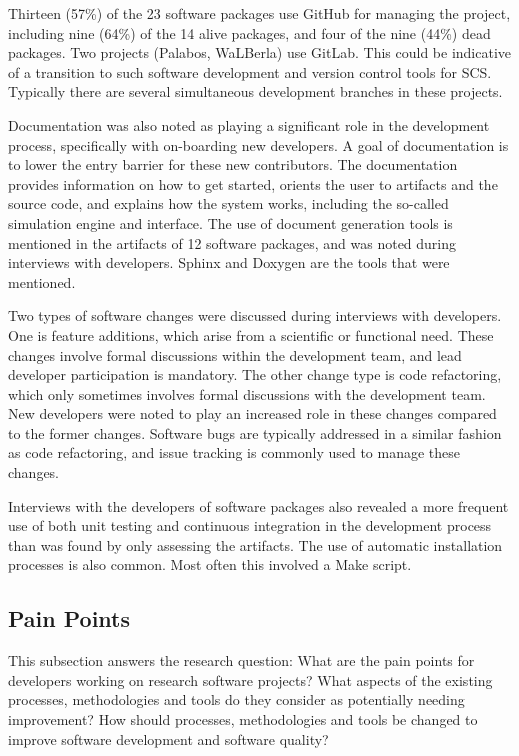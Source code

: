 \documentclass[final, 3p, times, authoryear]{elsarticle}
\begin{document}
Thirteen (57\%) of the 23 software packages use GitHub for managing the project,
including nine (64\%) of the 14 alive packages, and four of the nine (44\%) dead
packages. Two projects (Palabos, WaLBerla) use GitLab. This could be indicative
of a transition to such software development and version control tools for SCS.
Typically there are several simultaneous development branches in these projects.

Documentation was also noted as playing a significant role in the development
process, specifically with on-boarding new developers. A goal of documentation
is to lower the entry barrier for these new contributors. The documentation
provides information on how to get started, orients the user to artifacts and
the source code, and explains how the system works, including the so-called
simulation engine and interface. The use of document generation tools is
mentioned in the artifacts of 12 software packages, and was noted during
interviews with developers. Sphinx and Doxygen are the tools that were
mentioned. 

Two types of software changes were discussed during interviews with developers.
One is feature additions, which arise from a scientific or functional need.
These changes involve formal discussions within the development team, and lead
developer participation is mandatory. The other change type is code refactoring,
which only sometimes involves formal discussions with the development team. New
developers were noted to play an increased role in these changes compared to the
former changes. Software bugs are typically addressed in a similar fashion as
code refactoring, and issue tracking is commonly used to manage these changes. 

Interviews with the developers of software packages also revealed a more
frequent use of both unit testing and continuous integration in the development
process than was found by only assessing the artifacts. The use of automatic
installation processes is also common. Most often this involved a Make script.

\subsection{Pain Points} \label{painpoints}

This subsection answers the research question: What are the pain points for
developers working on research software projects? What aspects of the existing
processes, methodologies and tools do they consider as potentially needing
improvement? How should processes, methodologies and tools be changed to improve
software development and software quality?
\end{document}
